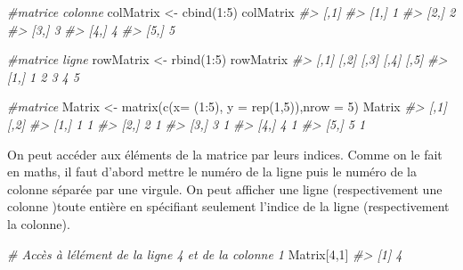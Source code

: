 \documentclass[
]{book}
\newenvironment{Shaded}{\begin{snugshade}}{\end{snugshade}}
\newcommand{\AttributeTok}[1]{\textcolor[rgb]{0.77,0.63,0.00}{#1}}
\newcommand{\CommentTok}[1]{\textcolor[rgb]{0.56,0.35,0.01}{\textit{#1}}}
\newcommand{\DecValTok}[1]{\textcolor[rgb]{0.00,0.00,0.81}{#1}}
\newcommand{\FunctionTok}[1]{\textcolor[rgb]{0.00,0.00,0.00}{#1}}
\newcommand{\NormalTok}[1]{#1}
\newcommand{\OtherTok}[1]{\textcolor[rgb]{0.56,0.35,0.01}{#1}}
\newcommand{\SpecialCharTok}[1]{\textcolor[rgb]{0.00,0.00,0.00}{#1}}
\theoremstyle{definition}
\theoremstyle{definition}
\theoremstyle{definition}
\theoremstyle{definition}
\theoremstyle{remark}
\begin{document}
\begin{Shaded}
\begin{Highlighting}[]
\CommentTok{\#matrice colonne}
\NormalTok{colMatrix }\OtherTok{\textless{}{-}} \FunctionTok{cbind}\NormalTok{(}\DecValTok{1}\SpecialCharTok{:}\DecValTok{5}\NormalTok{)}
\NormalTok{colMatrix}
\CommentTok{\#\textgreater{}      [,1]}
\CommentTok{\#\textgreater{} [1,]    1}
\CommentTok{\#\textgreater{} [2,]    2}
\CommentTok{\#\textgreater{} [3,]    3}
\CommentTok{\#\textgreater{} [4,]    4}
\CommentTok{\#\textgreater{} [5,]    5}
\end{Highlighting}
\end{Shaded}

\begin{Shaded}
\begin{Highlighting}[]
\CommentTok{\#matrice ligne}
\NormalTok{rowMatrix }\OtherTok{\textless{}{-}} \FunctionTok{rbind}\NormalTok{(}\DecValTok{1}\SpecialCharTok{:}\DecValTok{5}\NormalTok{)}
\NormalTok{rowMatrix}
\CommentTok{\#\textgreater{}      [,1] [,2] [,3] [,4] [,5]}
\CommentTok{\#\textgreater{} [1,]    1    2    3    4    5}
\end{Highlighting}
\end{Shaded}

\begin{Shaded}
\begin{Highlighting}[]
\CommentTok{\#matrice}
\NormalTok{Matrix }\OtherTok{\textless{}{-}} \FunctionTok{matrix}\NormalTok{(}\FunctionTok{c}\NormalTok{(}\AttributeTok{x=}\NormalTok{ (}\DecValTok{1}\SpecialCharTok{:}\DecValTok{5}\NormalTok{), }\AttributeTok{y =} \FunctionTok{rep}\NormalTok{(}\DecValTok{1}\NormalTok{,}\DecValTok{5}\NormalTok{)),}\AttributeTok{nrow =} \DecValTok{5}\NormalTok{)}
\NormalTok{Matrix}
\CommentTok{\#\textgreater{}      [,1] [,2]}
\CommentTok{\#\textgreater{} [1,]    1    1}
\CommentTok{\#\textgreater{} [2,]    2    1}
\CommentTok{\#\textgreater{} [3,]    3    1}
\CommentTok{\#\textgreater{} [4,]    4    1}
\CommentTok{\#\textgreater{} [5,]    5    1}
\end{Highlighting}
\end{Shaded}

On peut accéder aux éléments de la matrice par leurs indices. Comme on le fait en maths, il faut d'abord mettre le numéro de la ligne puis le numéro de la colonne séparée par une virgule.
On peut afficher une ligne (respectivement une colonne )toute entière en spécifiant seulement l'indice de la ligne (respectivement la colonne).

\begin{Shaded}
\begin{Highlighting}[]
\CommentTok{\# Accès à l\textquotesingle{}élément de la ligne 4 et de la colonne 1}
\NormalTok{Matrix[}\DecValTok{4}\NormalTok{,}\DecValTok{1}\NormalTok{]}
\CommentTok{\#\textgreater{} [1] 4}
\end{Highlighting}
\end{Shaded}
\end{document}
